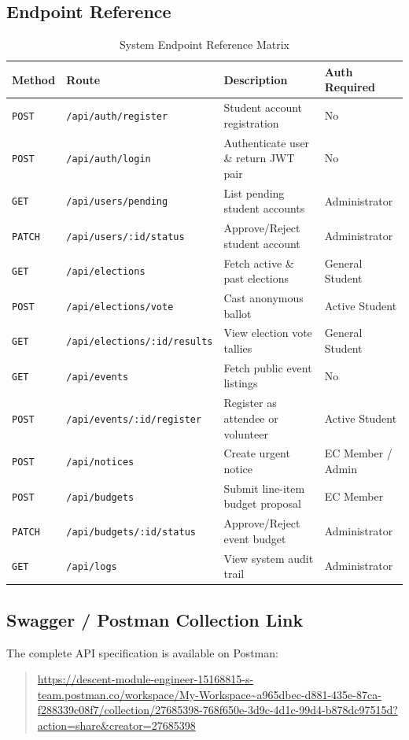 \documentclass[12pt, a4paper]{article}
\begin{document}
\subsection{Endpoint Reference}

\begin{table}[h!]
\centering
\caption{System Endpoint Reference Matrix}
\renewcommand{\arraystretch}{1.2}
\begin{tabular}{@{}llll@{}}
\toprule
\textbf{Method} & \textbf{Route} & \textbf{Description} & \textbf{Auth Required} \\ \midrule
\texttt{POST} & \texttt{/api/auth/register} & Student account registration & No \\
\texttt{POST} & \texttt{/api/auth/login} & Authenticate user \& return JWT pair & No \\
\texttt{GET} & \texttt{/api/users/pending} & List pending student accounts & Administrator \\
\texttt{PATCH} & \texttt{/api/users/:id/status} & Approve/Reject student account & Administrator \\
\texttt{GET} & \texttt{/api/elections} & Fetch active \& past elections & General Student \\
\texttt{POST} & \texttt{/api/elections/vote} & Cast anonymous ballot & Active Student \\
\texttt{GET} & \texttt{/api/elections/:id/results}& View election vote tallies & General Student \\
\texttt{GET} & \texttt{/api/events} & Fetch public event listings & No \\
\texttt{POST} & \texttt{/api/events/:id/register}& Register as attendee or volunteer & Active Student \\
\texttt{POST} & \texttt{/api/notices} & Create urgent notice & EC Member / Admin \\
\texttt{POST} & \texttt{/api/budgets} & Submit line-item budget proposal & EC Member \\
\texttt{PATCH} & \texttt{/api/budgets/:id/status}& Approve/Reject event budget & Administrator \\
\texttt{GET} & \texttt{/api/logs} & View system audit trail & Administrator \\ \bottomrule
\end{tabular}
\end{table}

\subsection{Swagger / Postman Collection Link}
The complete API specification is available on Postman:
\begin{quote}
\url{https://descent-module-engineer-15168815-s-team.postman.co/workspace/My-Workspace~a965dbec-d881-435e-87ca-f288339c08f7/collection/27685398-768f650e-3d9c-4d1c-99d4-b878dc97515d?action=share&creator=27685398}
\end{quote}
\end{document}
